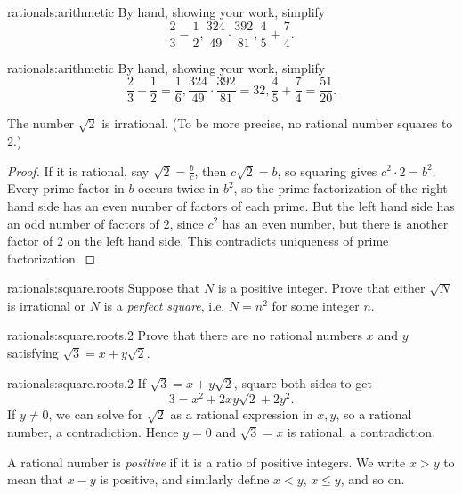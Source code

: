 \begin{problem}{rationals:arithmetic}
By hand, showing your work, simplify
\[
\frac{2}{3}-\frac{1}{2}, \frac{324}{49} \cdot \frac{392}{81},
\frac{4}{5}+\frac{7}{4}.
\]
\end{problem}
\begin{answer}{rationals:arithmetic}
By hand, showing your work, simplify
\[
\frac{2}{3}-\frac{1}{2}=\frac{1}{6}, \frac{324}{49} \cdot \frac{392}{81}=32,
\frac{4}{5}+\frac{7}{4}=\frac{51}{20}.
\]
\end{answer}

\begin{lemma}
The number \(\sqrt{2}\) is irrational.
(To be more precise, no rational number squares to \(2\).)
\end{lemma}
\begin{proof}
If it is rational, say \(\sqrt{2}=\frac{b}{c}\), then \(c \sqrt{2}=b\), so squaring gives \(c^2 \cdot 2 = b^2\).
Every prime factor in \(b\) occurs twice in \(b^2\), so the prime factorization of the right hand side has an even number of factors of each prime.
But the left hand side has an odd number of factors of \(2\), since \(c^2\) has an even number, but there is another factor of \(2\) on the left hand side.
This contradicts uniqueness of prime factorization.
\end{proof}

\begin{problem}{rationals:square.roots}
Suppose that \(N\) is a positive integer.
Prove that either \(\sqrt{N}\) is irrational or \(N\) is a \emph{perfect square}, i.e. \(N=n^2\) for some integer \(n\).
\end{problem}

\begin{problem}{rationals:square.roots.2}
Prove that there are no rational numbers \(x\) and \(y\) satisfying \(\sqrt{3}=x+y\sqrt{2}\).
\end{problem}
\begin{answer}{rationals:square.roots.2}
If \(\sqrt{3}=x+y\sqrt{2}\), square both sides to get
\[
3 = x^2+2xy\sqrt{2}+2y^2.
\]
If \(y\ne 0\), we can solve for \(\sqrt{2}\) as a rational expression in \(x,y\), so a rational number, a contradiction.
Hence \(y=0\) and \(\sqrt{3}=x\) is rational, a contradiction.
\end{answer}


A rational number is \emph{positive} if it is a ratio of positive integers.
We write \(x > y\) to mean that \(x-y\) is positive, and similarly define \(x<y\), \(x\le y\), and so on.

